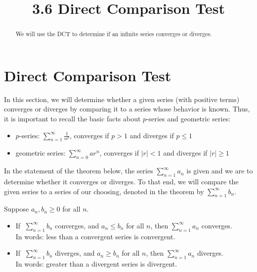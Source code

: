 \documentclass[handout]{ximera}
\title{3.6 Direct Comparison Test}
\begin{document}
\begin{abstract}
We will use the DCT to determine if an infinite series converges or diverges.
\end{abstract}

\maketitle

\section{Direct Comparison Test}

In this section, we will determine whether a given series (with positive terms) 
converges or diverges by comparing it to a series whose behavior is known. 
Thus, it is important to recall the basic facts about $p$-series and geometric series: 
\begin{itemize}
\item
 $p$-series: \; $\displaystyle \sum_{n=1}^\infty \frac{1}{n^p}$, 
converges if \;$p>1$ \;and diverges if \;$p\leq 1$
\item
geometric series:   $\displaystyle \sum_{n=0}^\infty ar^n$, converges if \;$|r|<1$\; and 
diverges if \;$|r|\geq 1$
\end{itemize}

In the statement of the theorem below, the series $\displaystyle \sum_{n=1}^\infty a_n$ is 
given and we are to determine whether it converges or diverges. To that end, we will 
compare the given series to a series of our choosing, denoted in the theorem 
by $\displaystyle \sum_{n=1}^\infty b_n$.


\begin{theorem}
 Suppose $a_n, b_n \geq 0$ for all $n$.\\
\begin{itemize}
\item
If $\; \displaystyle{\sum_{n=1}^\infty b_n}$ converges, and $a_n \leq b_n$ for all $n$,  
then $\displaystyle{\sum_{n=1}^\infty a_n}$ converges.\\
In words: less than a convergent series is convergent.\\
\item
If $\; \displaystyle{\sum_{n=1}^\infty b_n}$ diverges, and $a_n \geq b_n$ for all $n$,  
then $\displaystyle{\sum_{n=1}^\infty a_n}$ diverges.\\
In words: greater than a divergent series is divergent.\\
\end{itemize}
\end{theorem}
\end{document}
